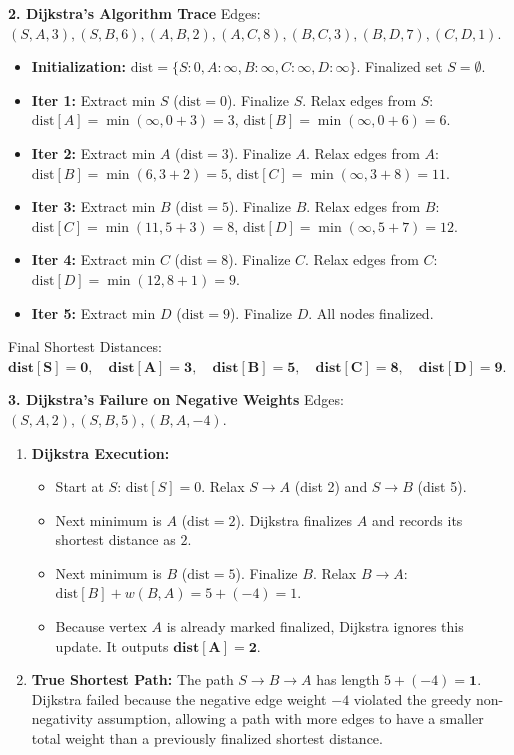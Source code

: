 \textbf{2. Dijkstra's Algorithm Trace}
Edges: $(S, A, 3), (S, B, 6), (A, B, 2), (A, C, 8), (B, C, 3), (B, D, 7), (C, D, 1)$.
\begin{itemize}
    \item \textbf{Initialization:} $\text{dist} = \{S: 0, A: \infty, B: \infty, C: \infty, D: \infty\}$. Finalized set $S = \emptyset$.
    \item \textbf{Iter 1:} Extract min $S$ ($\text{dist}=0$). Finalize $S$. Relax edges from $S$:
    $\text{dist}[A] = \min(\infty, 0 + 3) = 3$, $\text{dist}[B] = \min(\infty, 0 + 6) = 6$.
    \item \textbf{Iter 2:} Extract min $A$ ($\text{dist}=3$). Finalize $A$. Relax edges from $A$:
    $\text{dist}[B] = \min(6, 3 + 2) = 5$, $\text{dist}[C] = \min(\infty, 3 + 8) = 11$.
    \item \textbf{Iter 3:} Extract min $B$ ($\text{dist}=5$). Finalize $B$. Relax edges from $B$:
    $\text{dist}[C] = \min(11, 5 + 3) = 8$, $\text{dist}[D] = \min(\infty, 5 + 7) = 12$.
    \item \textbf{Iter 4:} Extract min $C$ ($\text{dist}=8$). Finalize $C$. Relax edges from $C$:
    $\text{dist}[D] = \min(12, 8 + 1) = 9$.
    \item \textbf{Iter 5:} Extract min $D$ ($\text{dist}=9$). Finalize $D$. All nodes finalized.
\end{itemize}
Final Shortest Distances: $\mathbf{\text{dist}[S] = 0, \quad \text{dist}[A] = 3, \quad \text{dist}[B] = 5, \quad \text{dist}[C] = 8, \quad \text{dist}[D] = 9}$.

\textbf{3. Dijkstra's Failure on Negative Weights}
Edges: $(S, A, 2), (S, B, 5), (B, A, -4)$.
\begin{enumerate}
    \item \textbf{Dijkstra Execution:}
    \begin{itemize}
        \item Start at $S$: $\text{dist}[S] = 0$. Relax $S \to A$ (dist 2) and $S \to B$ (dist 5).
        \item Next minimum is $A$ ($\text{dist}=2$). Dijkstra finalizes $A$ and records its shortest distance as $2$.
        \item Next minimum is $B$ ($\text{dist}=5$). Finalize $B$. Relax $B \to A$: $\text{dist}[B] + w(B, A) = 5 + (-4) = 1$.
        \item Because vertex $A$ is already marked finalized, Dijkstra ignores this update. It outputs $\mathbf{\text{dist}[A] = 2}$.
    \end{itemize}
    \item \textbf{True Shortest Path:} The path $S \to B \to A$ has length $5 + (-4) = \mathbf{1}$.
    Dijkstra failed because the negative edge weight $-4$ violated the greedy non-negativity assumption, allowing a path with more edges to have a smaller total weight than a previously finalized shortest distance.
\end{enumerate}

